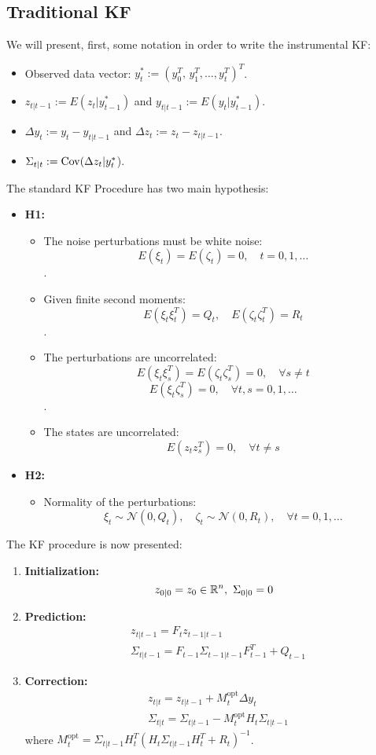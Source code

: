 \subsection{Traditional KF}
We will present, first, some notation in order to write the instrumental KF:
\begin{itemize}
  \item Observed data vector: $y^*_t:=(y_0^T,\,y_1^T,\dots,y_t^T)^T$.
  \item $z_{t|t-1}:=E(z_t|y^*_{t-1})$ and $y_{t|t-1}:=E(y_t|y^*_{t-1})$.
  \item $\Delta y_t:=y_t-y_{t|t-1}$ and $\Delta z_t:=z_t-z_{t|t-1}$.
  \item $\Sigma_{t|t}:={\rm Cov}(\Delta z_t|y_t^*$).
\end{itemize}
The standard KF
Procedure \cite{kalman1960new} has two main hypothesis:\\
\begin{itemize}
  \item \textbf{H1: }\begin{itemize}
    \item The noise perturbations must be white noise: \[E(\xi_t)=E(\zeta_t)=0, \quad t=0,1,\ldots\].
    \item Given finite second moments: \[E(\xi_t\xi_t^T)=Q_t, \quad E(\zeta_t\zeta_t^T)=R_t\].
    \item The perturbations are uncorrelated: \[E(\xi_t\xi_s^T)=E(\zeta_t\zeta_s^T)=0,\quad\forall s\neq t\]\[E(\xi_t\zeta_s^T)=0, \quad \forall t,s=0,1,\ldots\].
    \item The states are uncorrelated:
    \[E(z_tz_s^T)=0,\quad\forall t\neq s\]
  \end{itemize}
  \item \textbf{H2: }
  \begin{itemize}
    \item Normality of the perturbations:
    \[\xi_t\sim\mathcal{N}(0,Q_t),\quad\zeta_t\sim\mathcal{N}(0,R_t),\quad\forall t=0,1,\ldots\]
  \end{itemize}
\end{itemize}
The KF procedure is now presented:
\begin{enumerate}
  \item \textbf{Initialization: }
  \[
  z_{0|0}=z_0\in\R^n, \ \Sigma_{0|0}=0
  \]
  \item \textbf{Prediction: }
  \[
  \begin{split}
    &z_{t|t-1}=F_tz_{t-1|t-1}\\
    &\Sigma_{t|t-1}=F_{t-1}\Sigma_{t-1|t-1}F_{t-1}^T+Q_{t-1}
  \end{split}
  \]
  \item \textbf{Correction: }
  \[
  \begin{split}
    &z_{t | t}=z_{t | t-1}+M_{t}^{\text{opt}} \Delta y_{t} \\
    &\Sigma_{t | t}=\Sigma_{t | t-1}-M_{t}^{\text{opt}} H_{t} \Sigma_{t | t-1}
  \end{split}
  \]
  where ${M_{t}^{\text {opt}}=\Sigma_{t | t-1} H_{t}^{T}\left(H_{t} \Sigma_{t | t-1} H_{t}^{T}+R_{t}\right)^{-1}}$.
\end{enumerate}

